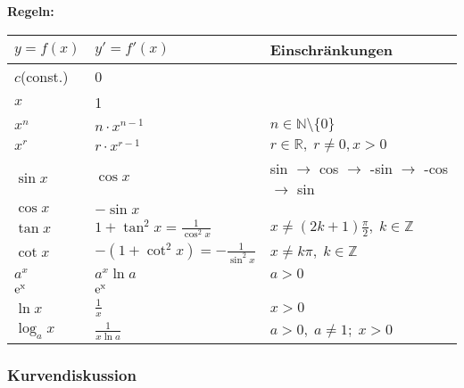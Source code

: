 \documentclass[6pt,a4paper]{scrartcl}
\begin{document}
\begin{multicols*}{2}
\textbf{Regeln:}\\
\begin{tabular}{l|l|l}
$ y=f(x) $		& $ y'=f'(x) $ 								& Einschränkungen 									\\
\hline
$ c $(const.)	& 0 																								\\	
$ x $			& 1																								\\
$ x^n $			& $ n \cdot x^{n-1} $						& $ n \in \mathbb N \setminus \{0\} $ 				\\
$ x^r $			& $ r \cdot x^{r-1} $						& $ r \in \mathbb R, \; r \neq 0, x>0 $ 				\\
$ \sin x $		& $ \cos x $ 								& sin $\rightarrow$ cos $\rightarrow$ -sin $\rightarrow$ -cos $\rightarrow$ sin\\	
$ \cos x $		& $ -\sin x $ 								&													\\
$ \tan x $		& $ 1+ \tan^2 x = \frac{1}{\cos^2 x} $		& $ x \neq (2k+1)\frac{\pi}{2}, \; k \in \mathbb Z $ 	\\
$ \cot x $		& $ -(1+ \cot^2 x) = - \frac{1}{\sin^2 x} $	& $ x \neq k \pi, \; k \in \mathbb Z $ 				\\
$ a^x $			& $ a^x \ln a $								& $ a>0 $ 											\\
$ \rm e^x $		& $ \rm e^x $ 								&													\\	
$ \ln x $		& $ \frac{1}{x} $							& $ x>0 $ 											\\
$ \log_a x $		& $ \frac{1}{x \ln a} $						& $ a>0, \; a \neq 1; \; x>0 $ 						\\
\end{tabular}

\subsubsection{Kurvendiskussion}


\end{multicols*}
\end{document}
